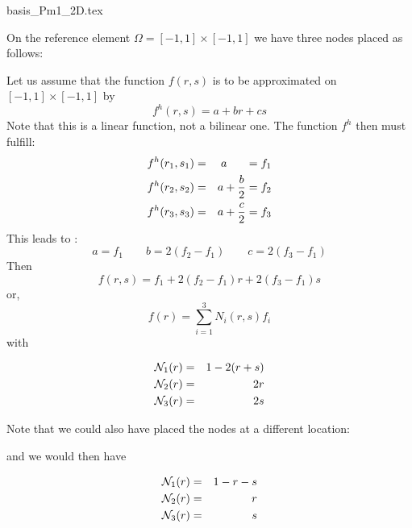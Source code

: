 \begin{flushright} {\tiny {\color{gray} basis\_Pm1\_2D.tex}} \end{flushright}

On the reference element $\Omega=[-1,1]\times[-1,1]$ we have three nodes placed as follows:



Let us assume that the function $f(r,s)$ is to be approximated on $[-1,1]\times[-1,1]$ by 
\[
f^h(r,s)=a+br+cs
\]
Note that this is a linear function, not a bilinear one. 
The function $f^h$ then must fulfill:
\begin{eqnarray}
f^h(r_1,s_1)&=&a \;\;\;\;\;\; =f_1    \nonumber\\
f^h(r_2,s_2)&=&a+\frac{b}{2}=f_2 \nonumber\\
f^h(r_3,s_3)&=&a+\frac{c}{2}=f_3 \nonumber
\end{eqnarray}
This leads to : 
\[
a=f_1
\quad
\quad
b=2(f_2-f_1)
\quad
\quad
c=2(f_3-f_1)
\]
Then
\[
f(r,s)=f_1 + 2(f_2-f_1) r + 2(f_3-f_1) s
\]
or, 
\[
f(r) = \sum_{i=1}^3 N_i(r,s) f_i
\]
with
\begin{mdframed}[backgroundcolor=blue!5]
\begin{eqnarray}
{\mathcal{N}}_1(r) &=& 1-2(r+s)  \nonumber\\
{\mathcal{N}}_2(r) &=& 2r   \nonumber\\
{\mathcal{N}}_3(r) &=& 2s
\end{eqnarray}
\end{mdframed}

Note that we could also have placed the nodes at a different location: 



and we would then have
\begin{mdframed}[backgroundcolor=blue!5]
\begin{eqnarray}
{\mathcal{N}}_1(r) &=& 1-r-s  \nonumber\\
{\mathcal{N}}_2(r) &=& r   \nonumber\\
{\mathcal{N}}_3(r) &=& s
\end{eqnarray}
\end{mdframed}






